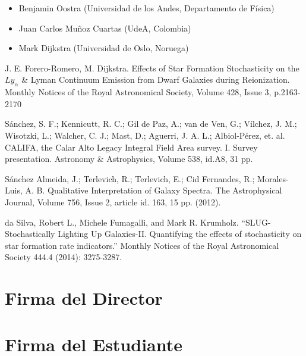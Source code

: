 \documentclass[12pt]{article}
\begin{document}

\begin{itemize}
	\item Benjamin Oostra (Universidad de los Andes, Departamento
          de F\'isica)
	\item Juan Carlos Mu\~noz Cuartas (UdeA, Colombia)
	\item Mark Dijkstra (Universidad de Oslo, Noruega)
\end{itemize}


\begin{thebibliography}{10}

 J. E. Forero-Romero, M. Dijkstra. Effects of Star Formation Stochasticity on the $Ly_{\alpha}$ \&
Lyman Continuum Emission from Dwarf Galaxies during
Reionization. Monthly Notices of the Royal Astronomical Society, Volume 428, Issue 3, p.2163-2170

 S\'anchez, S. F.; Kennicutt, R. C.; Gil de Paz,
A.; van de Ven, G.; V\'ilchez, J. M.; Wisotzki, L.; Walcher, C. J.;
Mast, D.; Aguerri, J. A. L.; Albiol-P\'erez, et. al. CALIFA, the
  Calar Alto Legacy Integral Field Area survey. I. Survey
  presentation. Astronomy \& Astrophysics, Volume 538, id.A8, 31 pp.

 S\'anchez Almeida, J.; Terlevich, R.; Terlevich, E.;
  Cid Fernandes, R.; Morales-Luis, A. B. Qualitative Interpretation of
  Galaxy Spectra. The Astrophysical Journal, Volume 756, Issue 2,
  article id. 163, 15 pp. (2012).




 da Silva, Robert L., Michele Fumagalli, and Mark R. Krumholz. ``SLUG-Stochastically Lighting Up Galaxies-II.
Quantifying the effects of stochasticity on star formation rate indicators.'' Monthly Notices of the Royal Astronomical Society
444.4 (2014): 3275-3287.

\end{thebibliography}

\section*{Firma del Director}
\vspace{1.5cm}

\section*{Firma del Estudiante	}
\end{document}
